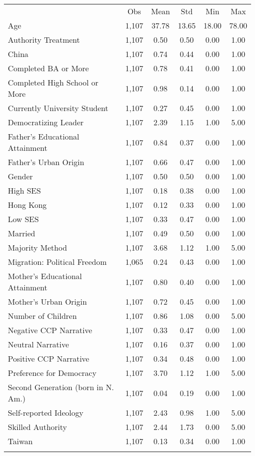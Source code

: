 \begin{center}
\begin{tabular}{lccccc}
\hline \noalign{\smallskip} & Obs & Mean & Std & Min & Max\\
\noalign{\smallskip}\hline \noalign{\smallskip}Age & 1,107 & 37.78 & 13.65 & 18.00 & 78.00\\
Authority Treatment & 1,107 & 0.50 & 0.50 & 0.00 & 1.00\\
China & 1,107 & 0.74 & 0.44 & 0.00 & 1.00\\
Completed BA or More & 1,107 & 0.78 & 0.41 & 0.00 & 1.00\\
Completed High School or More & 1,107 & 0.98 & 0.14 & 0.00 & 1.00\\
Currently University Student & 1,107 & 0.27 & 0.45 & 0.00 & 1.00\\
Democratizing Leader & 1,107 & 2.39 & 1.15 & 1.00 & 5.00\\
Father’s Educational Attainment & 1,107 & 0.84 & 0.37 & 0.00 & 1.00\\
Father's Urban Origin & 1,107 & 0.66 & 0.47 & 0.00 & 1.00\\
Gender & 1,107 & 0.50 & 0.50 & 0.00 & 1.00\\
High SES & 1,107 & 0.18 & 0.38 & 0.00 & 1.00\\
Hong Kong & 1,107 & 0.12 & 0.33 & 0.00 & 1.00\\
Low SES & 1,107 & 0.33 & 0.47 & 0.00 & 1.00\\
Married & 1,107 & 0.49 & 0.50 & 0.00 & 1.00\\
Majority Method & 1,107 & 3.68 & 1.12 & 1.00 & 5.00\\
Migration: Political Freedom & 1,065 & 0.24 & 0.43 & 0.00 & 1.00\\
Mother’s Educational Attainment & 1,107 & 0.80 & 0.40 & 0.00 & 1.00\\
Mother's Urban Origin & 1,107 & 0.72 & 0.45 & 0.00 & 1.00\\
Number of Children & 1,107 & 0.86 & 1.08 & 0.00 & 5.00\\
Negative CCP Narrative & 1,107 & 0.33 & 0.47 & 0.00 & 1.00\\
Neutral Narrative & 1,107 & 0.16 & 0.37 & 0.00 & 1.00\\
Positive CCP Narrative & 1,107 & 0.34 & 0.48 & 0.00 & 1.00\\
Preference for Democracy & 1,107 & 3.70 & 1.12 & 1.00 & 5.00\\
Second Generation (born in N. Am.) & 1,107 & 0.04 & 0.19 & 0.00 & 1.00\\
Self-reported Ideology & 1,107 & 2.43 & 0.98 & 1.00 & 5.00\\
Skilled Authority & 1,107 & 2.44 & 1.73 & 0.00 & 5.00\\
Taiwan & 1,107 & 0.13 & 0.34 & 0.00 & 1.00\\
\noalign{\smallskip}\hline\end{tabular}\\
\end{center}
